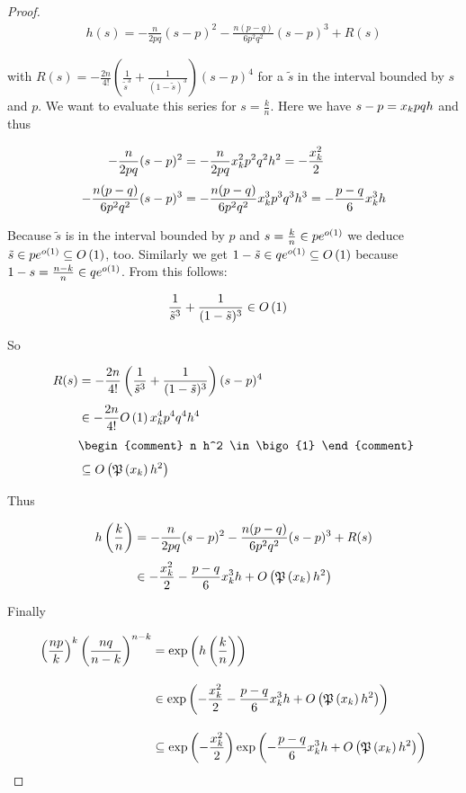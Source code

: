 \begin{proof}
  \begin{align}
    h(s) = -\frac{n}{2pq} (s-p)^2 - \frac{n(p-q)}{6p^2q^2} (s-p)^3 + R(s)
  \end{align}

  with $R(s)=-\frac{2n}{4!} \left(\frac{1}{\tilde s^3}+\frac{1}{(1-\tilde s)^3}\right) (s-p)^4$ for a $\tilde s$ in the interval bounded by $s$ and $p$. We want to evaluate this series for $s=\frac kn$. Here we have $s-p=x_{k} pqh$ and thus

  \begin{align}
    -\frac{n}{2pq} (s-p)^2 &= -\frac{n}{2pq} \x^2 p^2 q^2 h^2 = -\frac{\x^2}{2} \nl
    -\frac{n(p-q)}{6p^2q^2} (s-p)^3 &= -\frac{n(p-q)}{6p^2q^2} \x^3p^3q^3h^3 = -\frac{p-q}{6} \x^3 h
  \end{align}


  Because $\tilde s$ is in the interval bounded by $p$ and $s=\frac kn \in pe^{o\left( {1} \right)}$ we deduce $\tilde s \in pe^{o\left( {1} \right)}\subseteq O\left( {1} \right)$, too. Similarly we get $1-\tilde s\in qe^{o\left( {1} \right)} \subseteq O\left( {1} \right)$ because $1-s = \frac{n-k}{n} \in qe^{o\left( {1} \right)}$. From this follows:

  \begin{align}
    \frac 1{\tilde s^3} + \frac 1{(1-\tilde s)^3} & \in O\left( {1} \right)
  \end{align}

  \noindent So

  \begin{align}
    R(s) & = -\frac{2n}{4!} \left(\frac 1{\tilde s^3} + \frac 1{(1-\tilde s)^3}\right) (s-p)^4 \nl
    & \in -\frac{2n}{4!} \bigo{1} \x^4 p^4 q^4 h^4 \nl
    &
    \begin{comment}
      n h^2 \in \bigo{1}
    \end{comment} \nl
    & \subseteq \bigo{\pol{\x} h^2}
  \end{align}

  \noindent Thus

  \begin{align}
    \h{\frac kn} &=-\frac{n}{2pq} (s-p)^2 - \frac{n(p-q)}{6p^2q^2} (s-p)^3 + R(s) \nl
    & \in -\frac{\x^2}{2} - \frac{p-q}{6} \x^3 h + \bigo{\pol{\x} h^2}
  \end{align}

  \noindent Finally

  \begin{align}
    \left(\frac{np}{k}\right)^k \left(\frac{nq}{n-k}\right)^{n-k} & = \fexp{\h{\frac kn}} \bnl
    & \in \fexp{-\frac{\x^2}{2} - \frac{p-q}{6} \x^3 h + \bigo{\pol{\x} h^2}} \bnl
    & \subseteq \fexp{-\frac{\x^2}{2}} \fexp{-\frac{p-q}6 \x^3 h + \bigo{\pol{\x} h^2}}
  \end{align}


\end{proof}
